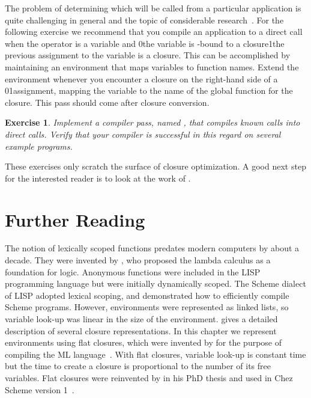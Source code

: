 \documentclass[7x10]{TimesAPriori_MIT}%
\def\racketEd{0}
\def\pythonEd{1}
\def\edition{1}
\newcommand{\racket}[1]{{\if\edition\racketEd{#1}\fi}}
\newcommand{\pythonColor}[0]{}
\newcommand{\python}[1]{{\if\edition\pythonEd\pythonColor #1\fi}}
\newtheorem{exercise}[theorem]{Exercise}
\numberwithin{theorem}{chapter}
\numberwithin{definition}{chapter}
\numberwithin{equation}{chapter}
\begin{document}
The problem of determining which  will be called from a
particular application is quite challenging in general and the topic
of considerable research~\citep{Shivers:1988aa,Gilray:2016aa}. For the
following exercise we recommend that you compile an application to a
direct call when the operator is a variable and \racket{the variable
  is -bound to a closure}\python{the previous assignment to
  the variable is a closure}.  This can be accomplished by maintaining
an environment that maps variables to function names.  Extend the
environment whenever you encounter a closure on the right-hand side of
a \racket{}\python{assignment}, mapping the variable to the
name of the global function for the closure. This pass should come
after closure conversion.

\begin{exercise}\normalfont\normalsize
Implement a compiler pass, named , that
compiles known calls into direct calls. Verify that your compiler is
successful in this regard on several example programs.
\end{exercise}

These exercises only scratch the surface of closure optimization. A
good next step for the interested reader is to look at the work of
\citet{Keep:2012ab}.

\section{Further Reading}

The notion of lexically scoped functions predates modern computers by
about a decade. They were invented by \citet{Church:1932aa}, who
proposed the lambda calculus as a foundation for logic. Anonymous
functions were included in the LISP~\citep{McCarthy:1960dz}
programming language but were initially dynamically scoped. The Scheme
dialect of LISP adopted lexical scoping, and
\citet{Guy-L.-Steele:1978yq} demonstrated how to efficiently compile
Scheme programs. However, environments were represented as linked
lists, so variable look-up was linear in the size of the
environment. \citet{Appel91} gives a detailed description of several
closure representations. In this chapter we represent environments
using flat closures, which were invented by
\citet{Cardelli:1983aa,Cardelli:1984aa} for the purpose of compiling
the ML language~\citep{Gordon:1978aa,Milner:1990fk}.  With flat
closures, variable look-up is constant time but the time to create a
closure is proportional to the number of its free variables.  Flat
closures were reinvented by \citet{Dybvig:1987ab} in his PhD thesis
and used in Chez Scheme version 1~\citep{Dybvig:2006aa}.
\end{document}
